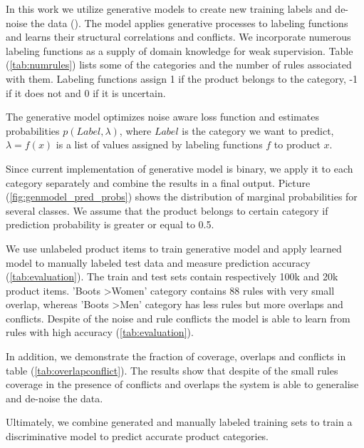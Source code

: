 
In this work we utilize generative models to create new training labels and de-noise the data (\cite{Ratner2016}).
The model applies generative processes to labeling functions and learns their structural correlations and conflicts.
We incorporate numerous labeling functions as a supply of domain knowledge for weak supervision. Table (\ref{tab:numrules})
lists some of the categories and the number of rules associated with them. Labeling functions assign 1 if the product belongs
to the category, -1 if it does not and 0 if it is uncertain\cite{genmodels}.

The generative model optimizes noise aware loss function and estimates probabilities $p(Label, \lambda)$,
where $Label$ is the category we want to predict, $\lambda = f(x)$ is a list of values assigned by labeling
functions $f$ to product $x$.

Since current implementation of generative model is binary, we apply it to each
category separately and combine the results in a final output. Picture (\ref{fig:genmodel_pred_probs}) shows
the distribution of marginal probabilities for several classes. We assume that the product belongs to certain category if
prediction probability is greater or equal to 0.5.

We use unlabeled product items to train generative model and apply learned model to manually labeled test data and measure
prediction accuracy (\ref{tab:evaluation}).
The train and test sets contain respectively 100k and 20k product items.
'Boots \textgreater Women' category contains 88 rules with very small overlap, whereas 'Boots \textgreater Men' category
has less rules but more overlaps and conflicts. Despite of the noise and rule conflicts the model is able to learn from rules with high accuracy (\ref{tab:evaluation}).

In addition, we demonstrate the fraction of coverage, overlaps and conflicts in table (\ref{tab:overlapconflict}). The results show that despite
of the small rules coverage in the presence of conflicts and overlaps the system is able to generalise and de-noise the data.

Ultimately, we combine generated and manually labeled training sets to train a discriminative model to predict accurate product categories.

